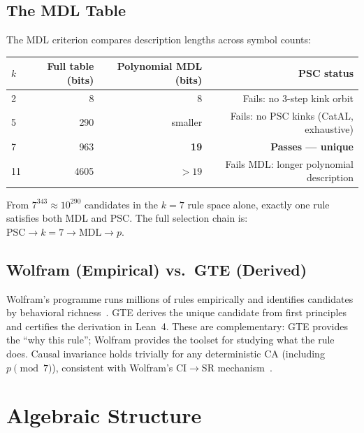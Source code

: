 \documentclass[11pt]{article}
\theoremstyle{remark}
\begin{document}
\subsection{The MDL Table}

The MDL criterion compares description lengths across symbol counts:

\begin{center}
\begin{tabular}{@{}lrrr@{}}
\toprule
$k$ & Full table (bits) & Polynomial MDL (bits) & PSC status \\
\midrule
2   & 8    & 8       & Fails: no 3-step kink orbit \\
5   & 290  & smaller & Fails: no PSC kinks (CatAL, exhaustive) \\
7   & 963  & \textbf{19} & \textbf{Passes --- unique} \\
11  & 4605 & $>19$   & Fails MDL: longer polynomial description \\
\bottomrule
\end{tabular}
\end{center}

\noindent From $7^{343} \approx 10^{290}$ candidates in the $k{=}7$ rule space
alone, exactly one rule satisfies both MDL and PSC. The full selection chain
is: $\mathrm{PSC} \to k{=}7 \to \mathrm{MDL} \to p$.

\subsection{Wolfram (Empirical) vs.\ GTE (Derived)}

Wolfram's programme runs millions of rules empirically and identifies candidates
by behavioral richness~\cite{Wolfram2002,Wolfram1984}. GTE derives the
unique candidate from first principles and certifies the derivation in Lean~4.
These are complementary: GTE provides the ``why this rule''; Wolfram provides
the toolset for studying what the rule does.
Causal invariance holds trivially for any deterministic CA (including $p
\pmod{7}$), consistent with Wolfram's CI$\to$SR mechanism~\cite{Gorard2020Rel}.

\section{Algebraic Structure}
\label{sec:algebra}
\end{document}
